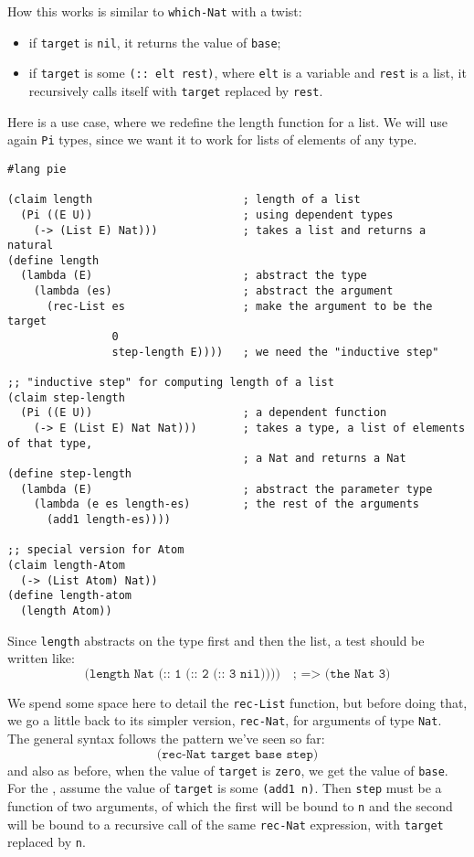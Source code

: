 How this works is similar to \texttt{which-Nat} with a twist:
\begin{itemize}
\item if \texttt{target} is \texttt{nil}, it returns the value
  of \texttt{base};
\item if \texttt{target} is some \texttt{(:: elt rest)},
  where \texttt{elt} is a variable and \texttt{rest} is a list, it
  recursively calls itself with \texttt{target} replaced by \texttt{rest}.
\end{itemize}

Here is a use case, where we redefine the length function for a list. We will
use again \texttt{Pi} types, since we want it to work for lists of elements
of any type.
{
  \small
\begin{verbatim}
#lang pie

(claim length                       ; length of a list
  (Pi ((E U))                       ; using dependent types
    (-> (List E) Nat)))             ; takes a list and returns a natural
(define length
  (lambda (E)                       ; abstract the type
    (lambda (es)                    ; abstract the argument
      (rec-List es                  ; make the argument to be the target
                0
                step-length E))))   ; we need the "inductive step"

;; "inductive step" for computing length of a list
(claim step-length
  (Pi ((E U))                       ; a dependent function
    (-> E (List E) Nat Nat)))       ; takes a type, a list of elements of that type,
                                    ; a Nat and returns a Nat
(define step-length
  (lambda (E)                       ; abstract the parameter type
    (lambda (e es length-es)        ; the rest of the arguments
      (add1 length-es))))

;; special version for Atom
(claim length-Atom
  (-> (List Atom) Nat))
(define length-atom
  (length Atom))
\end{verbatim}
}

Since \texttt{length} abstracts on the type first and then the list,
a test should be written like:
\[
  \texttt{(length Nat (:: 1 (:: 2 (:: 3 nil))))} \quad \texttt{; => (the Nat 3)}
\]

We spend some space here to detail the \texttt{rec-List} function, but before doing
that, we go a little back to its simpler version, \texttt{rec-Nat}, for arguments
of type \texttt{Nat}. The general syntax follows the pattern we've seen so far:
\[
  \texttt{(rec-Nat target base step)}
\]
and also as before, when the value of \texttt{target} is \texttt{zero},
we get the value of \texttt{base}. For the , assume
the value of \texttt{target} is some \texttt{(add1 n)}. Then \texttt{step} must
be a function of two arguments, of which the first will be bound to \texttt{n}
and the second will be bound to a recursive call of the same \texttt{rec-Nat}
expression, with \texttt{target} replaced by \texttt{n}.


